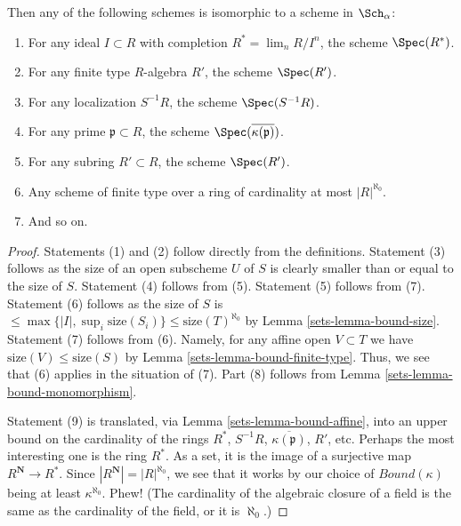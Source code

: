\begin{lemma}[What is in it]
\begin{enumerate}
Then any of the following schemes is isomorphic to a scheme
in $\Sch_\alpha$:
\begin{enumerate}
\item For any ideal $I \subset R$ with completion
$R^* = \lim_n R/I^n$, the scheme $\Spec(R^*)$.
\item For any finite type $R$-algebra $R'$, the
scheme $\Spec(R')$.
\item For any localization $S^{-1}R$, the scheme $\Spec(S^{-1}R)$.
\item For any prime $\mathfrak p \subset R$, the scheme
$\Spec(\overline{\kappa(\mathfrak p)})$.
\item For any subring $R' \subset R$, the scheme
$\Spec(R')$.
\item Any scheme of finite type over a ring of cardinality at most
$|R|^{\aleph_0}$.
\item And so on.
\end{enumerate}
\end{enumerate}
\end{lemma}

\begin{proof}

Statements (1) and (2) follow directly from the definitions.
Statement (3) follows as the size of an open subscheme $U$ of $S$ is
clearly smaller than or equal to the size of $S$.
Statement (4) follows from (5).
Statement (5) follows from (7).
Statement (6) follows as the size of $S$ is
$\leq \max\{|I|, \sup_i \text{size}(S_i)\} \leq \text{size}(T)^{\aleph_0}$
by Lemma \ref{sets-lemma-bound-size}. Statement (7) follows from (6).
Namely, for any affine open $V \subset T$ we have
$\text{size}(V) \leq \text{size}(S)$ by
Lemma \ref{sets-lemma-bound-finite-type}.
Thus, we see that (6) applies in the situation of (7).
Part (8) follows from
Lemma \ref{sets-lemma-bound-monomorphism}.

\medskip\noindent
Statement (9) is translated, via Lemma \ref{sets-lemma-bound-affine},
into an upper bound on the cardinality of the rings
$R^*$, $S^{-1}R$, $\overline{\kappa(\mathfrak p)}$, $R'$, etc.
Perhaps the most interesting one is the ring $R^*$. As a
set, it is the image of a surjective map $R^{\mathbf{N}} \to R^*$.
Since $|R^{\mathbf{N}}| = |R|^{\aleph_0}$, we see that
it works by our choice of $Bound(\kappa)$ being at least $\kappa^{\aleph_0}$.
Phew! (The cardinality of the algebraic closure of a field
is the same as the cardinality of the field, or it is $\aleph_0$.)
\end{proof}

